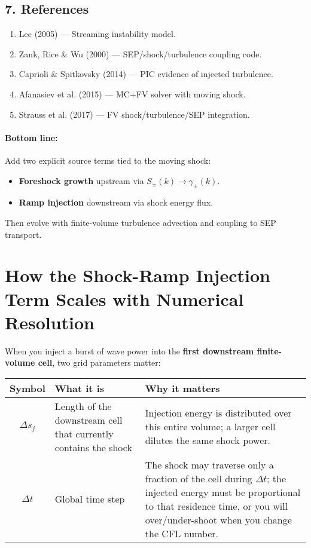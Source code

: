 \subsection*{7. References}
\begin{enumerate}
    \item Lee (2005) — Streaming instability model.
    \item Zank, Rice \& Wu (2000) — SEP/shock/turbulence coupling code.
    \item Caprioli \& Spitkovsky (2014) — PIC evidence of injected turbulence.
    \item Afanasiev et al. (2015) — MC+FV solver with moving shock.
    \item Strauss et al. (2017) — FV shock/turbulence/SEP integration.
\end{enumerate}

\paragraph{Bottom line:}
Add two explicit source terms tied to the moving shock:
\begin{itemize}
    \item \textbf{Foreshock growth} upstream via $S_\pm(k) \rightarrow \gamma_\pm(k)$.
    \item \textbf{Ramp injection} downstream via shock energy flux.
\end{itemize}
Then evolve with finite-volume turbulence advection and coupling to SEP transport.

\section*{How the Shock-Ramp Injection Term Scales with Numerical Resolution}

When you inject a burst of wave power into the \textbf{first downstream finite-volume cell}, two grid parameters matter:

\begin{table}[h!]
\centering
\begin{tabular}{|c|p{5.5cm}|p{7cm}|}
\hline
\textbf{Symbol} & \textbf{What it is} & \textbf{Why it matters} \\
\hline
$\Delta s_j$ & Length of the downstream cell that currently contains the shock & Injection energy is distributed over this entire volume; a larger cell dilutes the same shock power. \\
\hline
$\Delta t$ & Global time step & The shock may traverse only a fraction of the cell during $\Delta t$; the injected energy must be proportional to that residence time, or you will over/under-shoot when you change the CFL number. \\
\hline
\end{tabular}
\end{table}

